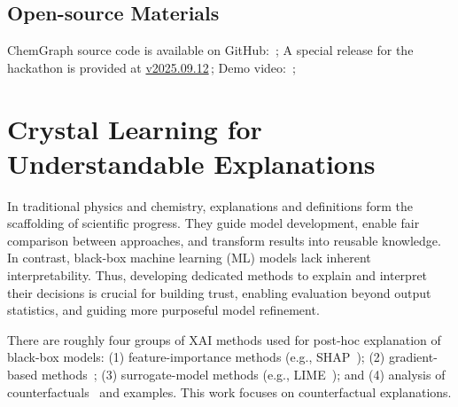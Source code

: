 \subsection*{Open-source Materials}
ChemGraph source code is available on GitHub: \,;
A special release for the hackathon is provided at \href{https://github.com/argonne-lcf/ChemGraph/releases/tag/v2025.09.12}{v2025.09.12}\,; Demo video: \,;




\section{Crystal Learning for Understandable Explanations}

In traditional physics and chemistry, explanations and definitions form the scaffolding of scientific progress. They guide model development, enable fair comparison between approaches, and transform results into reusable knowledge. In contrast, black-box machine learning (ML) models lack inherent interpretability. Thus, developing dedicated methods to explain and interpret their decisions is crucial for building trust, enabling evaluation beyond output statistics, and guiding more purposeful model refinement.

There are roughly four groups of XAI methods used for post-hoc explanation of black-box models: (1) feature-importance methods (e.g., SHAP~\cite{lundberg2017shap}); (2) gradient-based methods~\cite{Sundararajan2017}; (3) surrogate-model methods (e.g., LIME~\cite{Ribeiro2016}); and (4) analysis of counterfactuals~\cite{Wellawatte2023, Wellawatte2025} and examples. This work focuses on counterfactual explanations.

